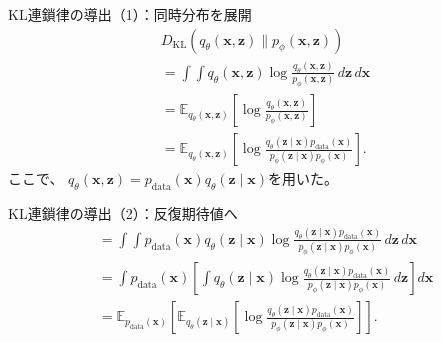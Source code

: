 \begin{frame}{KL連鎖律の導出（1）：同時分布を展開}
    \scriptsize
    \begin{align*}
        &D_{\mathrm{KL}}\left(
        q_\theta(\boldsymbol{x},\boldsymbol{z})
        \|p_\phi(\boldsymbol{x},\boldsymbol{z})
        \right)\\[4pt]
        &=
        \int\!\!\int q_\theta(\boldsymbol{x},\boldsymbol{z})
        \log
        \frac{
        q_\theta(\boldsymbol{x},\boldsymbol{z})
        }{
        p_\phi(\boldsymbol{x},\boldsymbol{z})
        }
        \,d\boldsymbol{z}\,d\boldsymbol{x}\\[4pt]
        &=
        \mathbb{E}_{q_\theta(\boldsymbol{x},\boldsymbol{z})}
        \left[
        \log
        \frac{
        q_\theta(\boldsymbol{x},\boldsymbol{z})
        }{
        p_\phi(\boldsymbol{x},\boldsymbol{z})
        }
        \right]\\[4pt]
        &=
        \mathbb{E}_{q_\theta(\boldsymbol{x},\boldsymbol{z})}
        \left[
        \log
        \frac{
        q_\theta(\boldsymbol{z}\mid\boldsymbol{x})
        p_{\mathrm{data}}(\boldsymbol{x})
        }{
        p_\phi(\boldsymbol{z}\mid\boldsymbol{x})
        p_\phi(\boldsymbol{x})
        }
        \right].
    \end{align*}
    \normalsize
    ここで、
    $q_\theta(\boldsymbol{x},\boldsymbol{z})
    =p_{\mathrm{data}}(\boldsymbol{x})
    q_\theta(\boldsymbol{z}\mid\boldsymbol{x})$を用いた。
\end{frame}
\begin{frame}{KL連鎖律の導出（2）：反復期待値へ}
    \scriptsize
    \begin{align*}
        &=
        \int\!\!\int
        p_{\mathrm{data}}(\boldsymbol{x})
        q_\theta(\boldsymbol{z}\mid\boldsymbol{x})
        \log
        \frac{
        q_\theta(\boldsymbol{z}\mid\boldsymbol{x})
        p_{\mathrm{data}}(\boldsymbol{x})
        }{
        p_\phi(\boldsymbol{z}\mid\boldsymbol{x})
        p_\phi(\boldsymbol{x})
        }
        \,d\boldsymbol{z}\,d\boldsymbol{x}\\[4pt]
        &=
        \int p_{\mathrm{data}}(\boldsymbol{x})
        \left[
        \int q_\theta(\boldsymbol{z}\mid\boldsymbol{x})
        \log
        \frac{
        q_\theta(\boldsymbol{z}\mid\boldsymbol{x})
        p_{\mathrm{data}}(\boldsymbol{x})
        }{
        p_\phi(\boldsymbol{z}\mid\boldsymbol{x})
        p_\phi(\boldsymbol{x})
        }
        \,d\boldsymbol{z}
        \right]d\boldsymbol{x}\\[4pt]
        &=
        \mathbb{E}_{p_{\mathrm{data}}(\boldsymbol{x})}
        \left[
        \mathbb{E}_{q_\theta(\boldsymbol{z}\mid\boldsymbol{x})}
        \left[
        \log
        \frac{
        q_\theta(\boldsymbol{z}\mid\boldsymbol{x})
        p_{\mathrm{data}}(\boldsymbol{x})
        }{
        p_\phi(\boldsymbol{z}\mid\boldsymbol{x})
        p_\phi(\boldsymbol{x})
        }
        \right]
        \right].
    \end{align*}
\end{frame}
